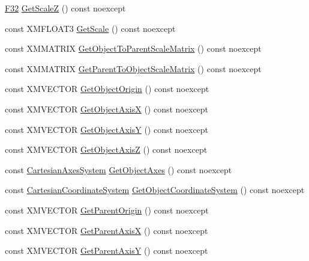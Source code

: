 \begin{DoxyCompactItemize}
\item 
\hyperlink{namespacemage_aa97e833b45f06d60a0a9c4fc22ae02c0}{F32} \hyperlink{structmage_1_1_transform_node_adcfc199469861d9af4cd8d532645ac99}{Get\+ScaleZ} () const noexcept
\item 
const X\+M\+F\+L\+O\+A\+T3 \hyperlink{structmage_1_1_transform_node_a23109efb661cb17d3957286952334dc2}{Get\+Scale} () const noexcept
\item 
const X\+M\+M\+A\+T\+R\+IX \hyperlink{structmage_1_1_transform_node_a0abee6b9b77888cd5ca44060256a33c7}{Get\+Object\+To\+Parent\+Scale\+Matrix} () const noexcept
\item 
const X\+M\+M\+A\+T\+R\+IX \hyperlink{structmage_1_1_transform_node_adad8b644fdd549028bb86f97606e2798}{Get\+Parent\+To\+Object\+Scale\+Matrix} () const noexcept
\item 
const X\+M\+V\+E\+C\+T\+OR \hyperlink{structmage_1_1_transform_node_a5f97b639779c4b9d24e144f1d8c9da12}{Get\+Object\+Origin} () const noexcept
\item 
const X\+M\+V\+E\+C\+T\+OR \hyperlink{structmage_1_1_transform_node_a0e31d129c0a6524a612ce28db24f0600}{Get\+Object\+AxisX} () const noexcept
\item 
const X\+M\+V\+E\+C\+T\+OR \hyperlink{structmage_1_1_transform_node_ad595911b6df1898a49263eb8e201d00c}{Get\+Object\+AxisY} () const noexcept
\item 
const X\+M\+V\+E\+C\+T\+OR \hyperlink{structmage_1_1_transform_node_a12e14a4d519295d6d1fb2b839061ef20}{Get\+Object\+AxisZ} () const noexcept
\item 
const \hyperlink{structmage_1_1_cartesian_axes_system}{Cartesian\+Axes\+System} \hyperlink{structmage_1_1_transform_node_a3e6b79b7e1a0844d8f93acaecdf65346}{Get\+Object\+Axes} () const noexcept
\item 
const \hyperlink{structmage_1_1_cartesian_coordinate_system}{Cartesian\+Coordinate\+System} \hyperlink{structmage_1_1_transform_node_a59417bfb21810840f90cee6a192e6ffd}{Get\+Object\+Coordinate\+System} () const noexcept
\item 
const X\+M\+V\+E\+C\+T\+OR \hyperlink{structmage_1_1_transform_node_a22a853447eaf646db3522e7f4093ae01}{Get\+Parent\+Origin} () const noexcept
\item 
const X\+M\+V\+E\+C\+T\+OR \hyperlink{structmage_1_1_transform_node_ac562bb1036c0bc55c0ededd8fa956fda}{Get\+Parent\+AxisX} () const noexcept
\item 
const X\+M\+V\+E\+C\+T\+OR \hyperlink{structmage_1_1_transform_node_a5d5138bb149828fa78da166129f996b1}{Get\+Parent\+AxisY} () const noexcept

\end{DoxyCompactItemize}
